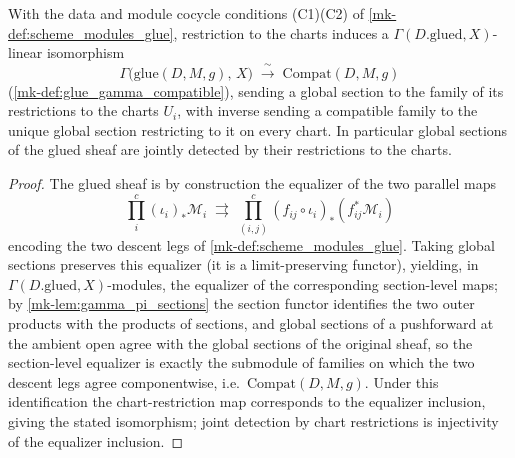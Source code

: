 \begin{lemma}
  \label{mk-lem:glue_sections_equalizer}
  \leanok
  With the data and module cocycle conditions (C1)(C2) of
  \ref{mk-def:scheme_modules_glue}, restriction to the charts induces a
  \(\Gamma(D.\mathrm{glued}, X)\)-linear isomorphism
  \[
    \Gamma\bigl(\mathrm{glue}(D,M,g),\, X\bigr) \;\xrightarrow{\ \sim\ }\;
      \mathrm{Compat}(D, M, g)
  \]
  (\ref{mk-def:glue_gamma_compatible}), sending a global section to the family
  of its restrictions to the charts \(U_i\), with inverse sending a
  compatible family to the unique global section restricting to it on every
  chart. In particular global sections of the glued sheaf are jointly
  detected by their restrictions to the charts.
\end{lemma}
\begin{proof}
  \leanok{}
  The glued sheaf is by construction the equalizer of the two parallel maps
  \[
    \textstyle\prod^{c}_i (\iota_i)_{*} \mathcal M_i \;\rightrightarrows\;
      \prod^{c}_{(i,j)} (f_{ij} \circ \iota_i)_{*} (f_{ij}^{*} \mathcal M_i)
  \]
  encoding the two descent legs of \ref{mk-def:scheme_modules_glue}. Taking
  global sections preserves this equalizer (it is a limit-preserving
  functor), yielding, in \(\Gamma(D.\mathrm{glued}, X)\)-modules, the
  equalizer of the corresponding section-level maps; by
  \ref{mk-lem:gamma_pi_sections} the section functor identifies the two outer
  products with the products of sections, and global sections of a
  pushforward at the ambient open agree with the global sections of the
  original sheaf, so the section-level equalizer is exactly the submodule of
  families on which the two descent legs agree componentwise, i.e.\
  \(\mathrm{Compat}(D,M,g)\). Under this identification the chart-restriction
  map corresponds to the equalizer inclusion, giving the stated isomorphism;
  joint detection by chart restrictions is injectivity of the equalizer
  inclusion.
\end{proof}


